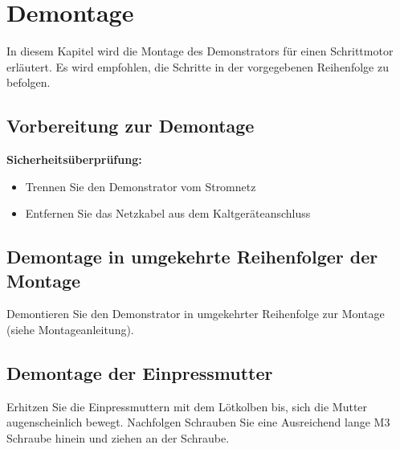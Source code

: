 %

\chapter{Demontage}
In diesem Kapitel wird die Montage des Demonstrators für einen Schrittmotor erläutert. Es wird empfohlen, die Schritte in der vorgegebenen Reihenfolge zu befolgen.


\section{ Vorbereitung zur Demontage}

\textbf{Sicherheitsüberprüfung:}\begin{itemize}
		\item Trennen Sie den Demonstrator vom Stromnetz 
		\item Entfernen Sie das Netzkabel aus dem Kaltgeräteanschluss
	\end{itemize}

\section{ Demontage in umgekehrte Reihenfolger der Montage}

Demontieren Sie den Demonstrator in umgekehrter Reihenfolge zur Montage (siehe Montageanleitung).

\section{ Demontage der Einpressmutter}
Erhitzen Sie die Einpressmuttern mit dem Lötkolben bis, sich die Mutter augenscheinlich bewegt. Nachfolgen Schrauben Sie eine Ausreichend lange M3 Schraube hinein und ziehen an der Schraube.

